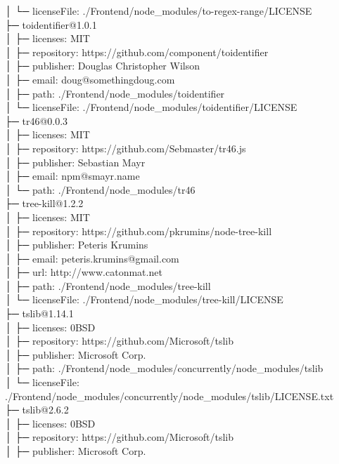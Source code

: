 │  └─ licenseFile: ./Frontend/node\_modules/to-regex-range/LICENSE\\
├─ toidentifier@1.0.1\\
│  ├─ licenses: MIT\\
│  ├─ repository: https://github.com/component/toidentifier\\
│  ├─ publisher: Douglas Christopher Wilson\\
│  ├─ email: doug@somethingdoug.com\\
│  ├─ path: ./Frontend/node\_modules/toidentifier\\
│  └─ licenseFile: ./Frontend/node\_modules/toidentifier/LICENSE\\
├─ tr46@0.0.3\\
│  ├─ licenses: MIT\\
│  ├─ repository: https://github.com/Sebmaster/tr46.js\\
│  ├─ publisher: Sebastian Mayr\\
│  ├─ email: npm@smayr.name\\
│  └─ path: ./Frontend/node\_modules/tr46\\
├─ tree-kill@1.2.2\\
│  ├─ licenses: MIT\\
│  ├─ repository: https://github.com/pkrumins/node-tree-kill\\
│  ├─ publisher: Peteris Krumins\\
│  ├─ email: peteris.krumins@gmail.com\\
│  ├─ url: http://www.catonmat.net\\
│  ├─ path: ./Frontend/node\_modules/tree-kill\\
│  └─ licenseFile: ./Frontend/node\_modules/tree-kill/LICENSE\\
├─ tslib@1.14.1\\
│  ├─ licenses: 0BSD\\
│  ├─ repository: https://github.com/Microsoft/tslib\\
│  ├─ publisher: Microsoft Corp.\\
│  ├─ path: ./Frontend/node\_modules/concurrently/node\_modules/tslib\\
│  └─ licenseFile: ./Frontend/node\_modules/concurrently/node\_modules/tslib/LICENSE.txt\\
├─ tslib@2.6.2\\
│  ├─ licenses: 0BSD\\
│  ├─ repository: https://github.com/Microsoft/tslib\\
│  ├─ publisher: Microsoft Corp.\\
